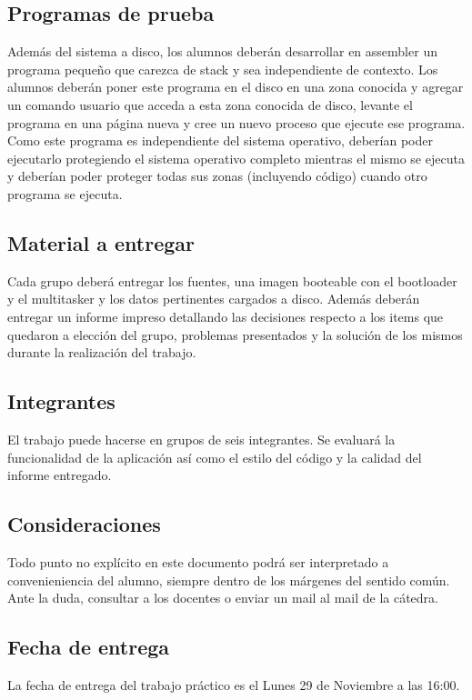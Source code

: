 \documentclass[a4paper,10pt]{article}
\begin{document}
\subsection{Programas de prueba}
\par
Además del sistema a disco, los alumnos deberán desarrollar en assembler un
programa pequeño que carezca de stack y sea independiente de contexto. Los
alumnos deberán poner este programa en el disco en una zona conocida y agregar
un comando usuario que acceda a esta zona conocida de disco, levante
el programa en una página nueva y cree un nuevo proceso que ejecute ese programa. 
Como este programa es independiente del sistema operativo, deberían
poder ejecutarlo protegiendo el sistema operativo completo mientras el mismo
se ejecuta y deberían poder proteger todas sus zonas (incluyendo código) cuando
otro programa se ejecuta.


\subsection{Material a entregar}
\par
Cada grupo deberá entregar los fuentes, una imagen booteable con el bootloader
y el multitasker y los datos pertinentes cargados a disco. Además deberán
entregar un informe impreso detallando las decisiones respecto a los items que
quedaron a elección del grupo, problemas presentados y la solución de los mismos
durante la realización del trabajo.

\subsection{Integrantes}
\par
El trabajo puede hacerse en grupos de seis integrantes. Se evaluará la funcionalidad
de la aplicación así como el estilo del código y la calidad del informe entregado.

\subsection{Consideraciones}
\par
Todo punto no explícito en este documento podrá ser interpretado a convenieniencia
del alumno, siempre dentro de los márgenes del sentido común. Ante la
duda, consultar a los docentes o enviar un mail al mail de la cátedra.

\subsection{Fecha de entrega}
\par
La fecha de entrega del trabajo práctico es el Lunes 29 de Noviembre a las 16:00.
\end{document}
